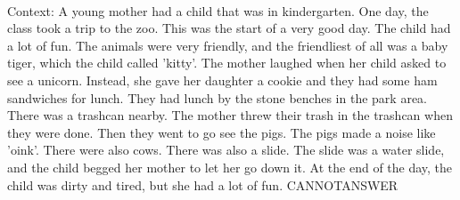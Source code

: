 \documentclass[11pt,a4paper, onecolumn]{article}
\begin{document}
\\ Context: A young mother had a child that was in kindergarten. One day, the class took a trip to the zoo. This was the start of a very good day. The child had a lot of fun. The animals were very friendly, and the friendliest of all was a baby tiger, which the child called 'kitty'. The mother laughed when her child asked to see a unicorn. Instead, she gave her daughter a cookie and they had some ham sandwiches for lunch. They had lunch by the stone benches in the park area. There was a trashcan nearby. The mother threw their trash in the trashcan when they were done. Then they went to go see the pigs. The pigs made a noise like 'oink'. There were also cows. There was also a slide. The slide was a water slide, and the child begged her mother to let her go down it. At the end of the day, the child was dirty and tired, but she had a lot of fun. CANNOTANSWER
\end{document}
